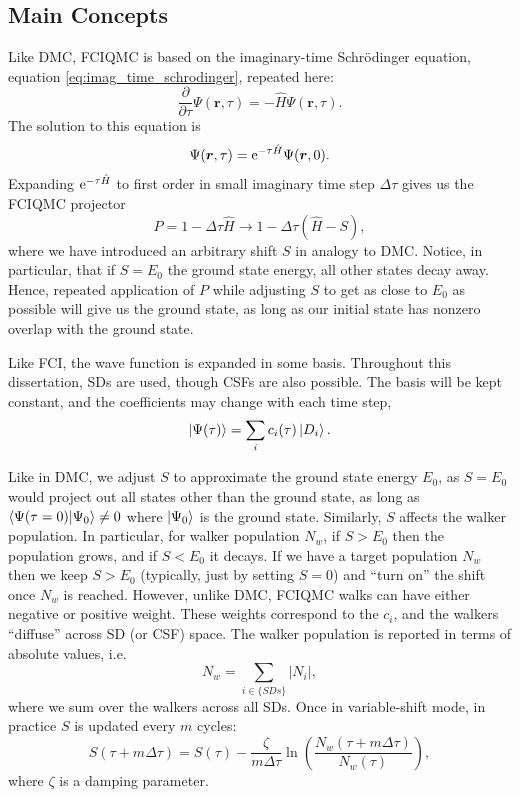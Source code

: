\subsection{Main Concepts}

Like \gls{DMC}, \gls{FCIQMC} is based on the imaginary-time Schr\"odinger equation, equation \ref{eq:imag_time_schrodinger}, repeated here:
\begin{equation}
    \frac{\partial}{\partial\tau}\Psi(\bm r, \tau) = -\hat H\Psi(\bm r, \tau).
\end{equation}
The solution to this equation is
\begin{equation}
    \Psi(\bm r, \tau) = \mathrm{e}^{-\tau\hat H}\Psi(\bm r, 0).
\end{equation}
Expanding $\mathrm{e}^{-\tau\hat H}$ to first order in small imaginary time step $\Delta\tau$ gives us the FCIQMC projector
\begin{equation}
    \label{eq:fciqmc_projector}
    P = 1-\Delta\tau\hat H \to 1-\Delta\tau(\hat H - S),
\end{equation}
where we have introduced an arbitrary shift $S$ in analogy to \gls{DMC}. Notice, in particular, that if $S=E_0$ the ground state energy, all other states decay away. Hence, repeated application of $P$ while adjusting $S$ to get as close to $E_0$ as possible will give us the ground state, as long as our initial state has nonzero overlap with the ground state.

Like \gls{FCI}, the wave function is expanded in some basis. Throughout this dissertation, \glspl{SD} are used, though \glspl{CSF} are also possible. The basis will be kept constant, and the coefficients may change with each time step,
\begin{equation}
    \ket{\Psi(\tau)} = \sum_i c_i(\tau)\ket{D_i}.
\end{equation}

Like in \gls{DMC}, we adjust $S$ to approximate the ground state energy $E_0$, as $S=E_0$ would project out all states other than the ground state, as long as $\braket{\Psi(\tau=0)}{\Psi_0}\neq 0$ where $\ket{\Psi_0}$ is the ground state. Similarly, $S$ affects the walker population. In particular, for walker population $N_w$, if $S>E_0$ then the population grows, and if $S<E_0$ it decays. If we have a target population $N_w$ then we keep $S>E_0$ (typically, just by setting $S=0$) and ``turn on'' the shift once $N_w$ is reached. However, unlike DMC, \gls{FCIQMC} walks can have either negative or positive weight. These weights correspond to the $c_i$, and the walkers ``diffuse'' across \gls{SD} (or \gls{CSF}) space. The walker population is reported in terms of absolute values, i.e.
\begin{equation}
    N_w = \sum_{i\in\{SDs\}}|N_i|,
\end{equation}
where we sum over the walkers across all \glspl{SD}. Once in variable-shift mode, in practice $S$ is updated every $m$ cycles:
\begin{equation}
    S(\tau+m\Delta\tau) = S(\tau) - \frac{\zeta}{m\Delta\tau}\ln\left(\frac{N_w(\tau+m\Delta\tau)}{N_w(\tau)}\right),
\end{equation}
where $\zeta$ is a damping parameter.

